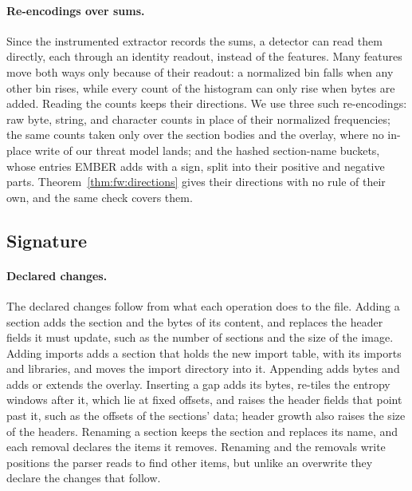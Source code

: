 \paragraph{Re-encodings over sums.}
\label{sec:instances:sums}
Since the instrumented extractor records the sums, a detector can read them directly, each through an identity
readout, instead of the features. Many features move both ways only because of their readout: a normalized bin falls
when any other bin rises, while every count of the histogram can only rise when bytes are added. Reading the counts
keeps their directions. We use three such re-encodings: raw byte, string, and character counts in place of their
normalized frequencies; the same counts taken only over the section bodies and the overlay, where no in-place write of
our threat model lands; and the hashed section-name buckets, whose entries EMBER adds with a sign, split into their
positive and negative parts. Theorem~\ref{thm:fw:directions} gives their directions with no rule of their own, and the
same check covers them.

\subsection{Signature}
\label{sec:ember:operations}

\paragraph{Declared changes.} The declared changes follow from what each operation does to the file. Adding a section
adds the section and the bytes of its content, and replaces the header fields it must update, such as the number of
sections and the size of the image. Adding imports adds a section that holds the new import table, with its imports
and libraries, and moves the import directory into it. Appending adds bytes and adds or extends the overlay. Inserting
a gap adds its bytes, re-tiles the entropy windows after it, which lie at fixed offsets, and raises the header fields
that point past it, such as the offsets of the sections' data; header growth also raises the size of the headers.
Renaming a section keeps the section and replaces its name, and each removal declares the items it removes. Renaming
and the removals write positions the parser reads to find other items, but unlike an overwrite they declare the
changes that follow.

